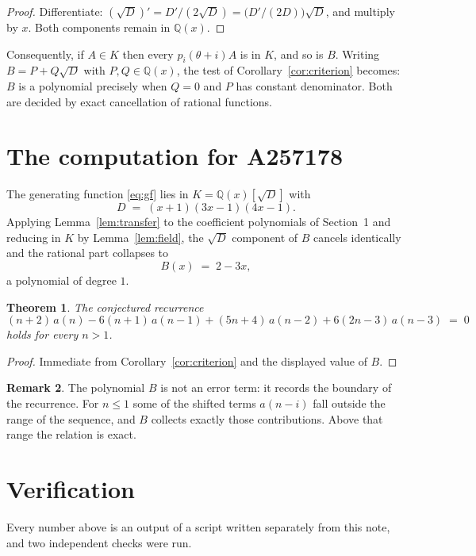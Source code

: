 \documentclass[11pt,a4paper]{article}
\theoremstyle{plain}
\newtheorem{theorem}{Theorem}
\theoremstyle{definition}
\newtheorem{remark}[theorem]{Remark}
\begin{document}
\begin{proof}
Differentiate: $(\sqrt{D})'=D'/(2\sqrt{D})=\bigl(D'/(2D)\bigr)\sqrt{D}$, and multiply by
$x$. Both components remain in $\mathbb{Q}(x)$.
\end{proof}

Consequently, if $A\in K$ then every $p_{i}(\theta+i)A$ is in $K$, and so is $B$. Writing
$B=P+Q\sqrt{D}$ with $P,Q\in\mathbb{Q}(x)$, the test of Corollary~\ref{cor:criterion}
becomes: $B$ is a polynomial precisely when $Q=0$ and $P$ has constant denominator. Both
are decided by exact cancellation of rational functions.

\section{The computation for A257178}

The generating function \eqref{eq:gf} lies in $K=\mathbb{Q}(x)[\sqrt{D}]$ with
\[
D \;=\; \left(x + 1\right) \left(3 x - 1\right) \left(4 x - 1\right) .
\]
Applying Lemma~\ref{lem:transfer} to the coefficient polynomials of Section~1 and reducing
in $K$ by Lemma~\ref{lem:field}, the $\sqrt{D}$ component of $B$ cancels identically and
the rational part collapses to
\[
B(x)\;=\;2 - 3 x ,
\]
a polynomial of degree $1$.

\begin{theorem}
The conjectured recurrence
\[
(n + 2)\,a(n) -  6 \left(n + 1\right)\,a(n-1) + (5 n + 4)\,a(n-2) + 6 \left(2 n - 3\right)\,a(n-3) \;=\;0
\]
holds for every $n>1$.
\end{theorem}

\begin{proof}
Immediate from Corollary~\ref{cor:criterion} and the displayed value of $B$.
\end{proof}

\begin{remark}
The polynomial $B$ is not an error term: it records the boundary of the recurrence. For
$n\le1$ some of the shifted terms $a(n-i)$ fall outside the range of the sequence,
and $B$ collects exactly those contributions. Above that range the relation is exact.
\end{remark}

\section{Verification}

Every number above is an output of a script written separately from this note, and two
independent checks were run.
\end{document}
